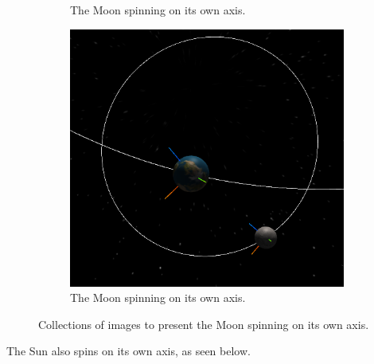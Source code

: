 \documentclass[12pt]{article}
\begin{document}
\begin{figure}[H]
\begin{subfigure}[b]{0.4\textwidth}
                \caption{The Moon spinning on its own axis.}
                \label{fig: The axial spin of the Moon.}
       \end{subfigure}
               \begin{subfigure}[b]{0.4\textwidth}
                \includegraphics[width=\textwidth]{images/earthandmoonaxisspinabove4}
                \caption{The Moon spinning on its own axis.}
                \label{fig: The axial spin of the Moon.}
       \end{subfigure}
       \caption{Collections of images to present the Moon spinning on its own axis.}\label{fig: The Moon's axial rotation.}
\end{figure}

The Sun also spins on its own axis, as seen below.
\end{document}
